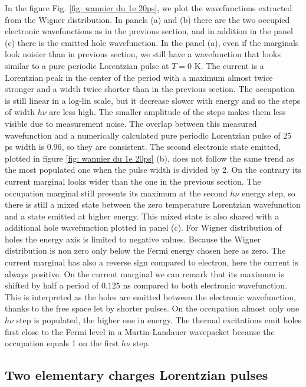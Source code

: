 In the figure Fig. \ref{fig: wannier du 1e 20ps}, we plot the wavefunctions extracted from the Wigner distribution.
In panels (a) and (b) there are the two occupied electronic wavefunctions as in the previous section, and in addition in the panel (c) there is the emitted hole wavefunction.
In the panel (a), even if the marginals look noisier than in previous section, we still have a wavefunction that looks similar to a pure periodic Lorentzian pulse at $T=0$ K.
The current is a Lorentzian peak in the center of the period with a maximum almost twice stronger and a width twice shorter than in the previous section.
The occupation is still linear in a log-lin scale, but it decrease slower with energy and so the steps of width $h\nu$ are less high.
The smaller amplitude of the steps makes them less visible due to measurement noise.
The overlap between this measured wavefunction and a numerically calculated pure periodic Lorentzian pulse of 25 ps width is $0.96$, so they are consistent.
The second electronic state emitted, plotted in figure \ref{fig: wannier du 1e 20ps} (b), does not follow the same trend as the most populated one when the pulse width is divided by 2.
On the contrary its current marginal looks wider than the one in the previous section.
The occupation marginal still presents its maximum at the second $h\nu$ energy step, so there is still a mixed state between the zero temperature Lorentzian wavefunction and a state emitted at higher energy.
This mixed state is also shared with a additional hole wavefunction plotted in panel (c).
For Wigner distribution of holes the energy axis is limited to negative values.
Because the Wigner distribution is non zero only below the Fermi energy chosen here as zero.
The current marginal has also a reverse sign compared to electron, here the current is always positive.
On the current marginal we can remark that its maximum is shifted by half a period of $0.125$ ns compared to both electronic wavefunction.
This is interpreted as the holes are emitted between the electronic wavefunction, thanks to the free space let by shorter pulses.
On the occupation almost only one $h\nu$ step is populated, the higher one in energy.
The thermal excitations emit holes first close to the Fermi level in a Martin-Landauer wavepacket \cite{martin1992wave,roussel2017autopsy} because the occupation equals 1 on the first $h\nu$ step.


\subsection{Two elementary charges Lorentzian pulses}

